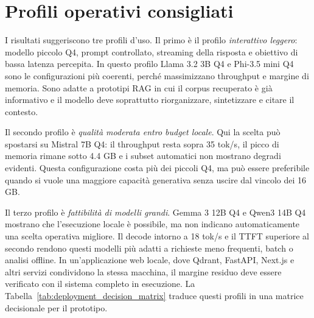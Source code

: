 \section{Profili operativi consigliati}
\label{sec:evaluation_operational_profiles}

I risultati suggeriscono tre profili d'uso. Il primo è il profilo
\emph{interattivo leggero}: modello piccolo Q4, prompt controllato, streaming
della risposta e obiettivo di bassa latenza percepita. In questo profilo Llama
3.2 3B Q4 e Phi-3.5 mini Q4 sono le configurazioni più coerenti, perché
massimizzano throughput e margine di memoria. Sono adatte a prototipi RAG in cui
il corpus recuperato è già informativo e il modello deve soprattutto
riorganizzare, sintetizzare e citare il contesto.

Il secondo profilo è \emph{qualità moderata entro budget locale}. Qui la
scelta può spostarsi su Mistral 7B Q4: il throughput resta sopra 35 tok/s, il
picco di memoria rimane sotto 4.4 GB e i subset automatici non mostrano degradi
evidenti. Questa configurazione costa più dei piccoli Q4, ma può essere
preferibile quando si vuole una maggiore capacità generativa senza uscire dal
vincolo dei 16 GB.

Il terzo profilo è \emph{fattibilità di modelli grandi}. Gemma 3 12B Q4 e
Qwen3 14B Q4 mostrano che l'esecuzione locale è possibile, ma non indicano
automaticamente una scelta operativa migliore. Il decode intorno a 18 tok/s e
il TTFT superiore al secondo rendono questi modelli più adatti a richieste
meno frequenti, batch o analisi offline. In un'applicazione web locale, dove
Qdrant, FastAPI, Next.js e altri servizi condividono la stessa macchina, il
margine residuo deve essere verificato con il sistema completo in esecuzione.
La Tabella~\ref{tab:deployment_decision_matrix} traduce questi profili in una
matrice decisionale per il prototipo.

